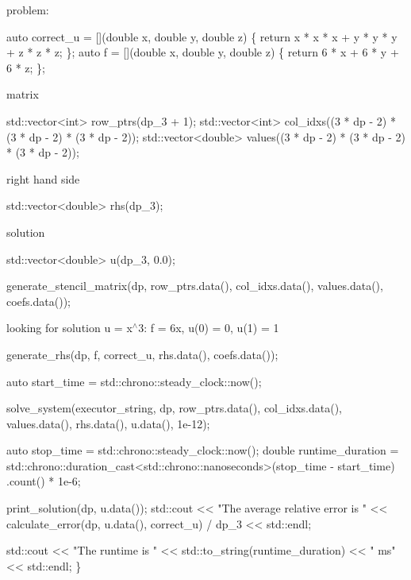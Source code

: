 problem\+:


\begin{DoxyCode}
\textcolor{keyword}{auto} correct\_u = [](\textcolor{keywordtype}{double} x, \textcolor{keywordtype}{double} y, \textcolor{keywordtype}{double} z) \{
    \textcolor{keywordflow}{return} x * x * x + y * y * y + z * z * z;
\};
\textcolor{keyword}{auto} f = [](\textcolor{keywordtype}{double} x, \textcolor{keywordtype}{double} y, \textcolor{keywordtype}{double} z) \{ \textcolor{keywordflow}{return} 6 * x + 6 * y + 6 * z; \};
\end{DoxyCode}


matrix


\begin{DoxyCode}
std::vector<int> row\_ptrs(dp\_3 + 1);
std::vector<int> col\_idxs((3 * dp - 2) * (3 * dp - 2) * (3 * dp - 2));
std::vector<double> values((3 * dp - 2) * (3 * dp - 2) * (3 * dp - 2));
\end{DoxyCode}


right hand side


\begin{DoxyCode}
std::vector<double> rhs(dp\_3);
\end{DoxyCode}


solution


\begin{DoxyCode}
std::vector<double> u(dp\_3, 0.0);

generate\_stencil\_matrix(dp, row\_ptrs.data(), col\_idxs.data(), values.data(),
                        coefs.data());
\end{DoxyCode}


looking for solution u = x$^\wedge$3\+: f = 6x, u(0) = 0, u(1) = 1


\begin{DoxyCode}
    generate\_rhs(dp, f, correct\_u, rhs.data(), coefs.data());

    \textcolor{keyword}{auto} start\_time = std::chrono::steady\_clock::now();

    solve\_system(executor\_string, dp, row\_ptrs.data(), col\_idxs.data(),
                 values.data(), rhs.data(), u.data(), 1e-12);

    \textcolor{keyword}{auto} stop\_time = std::chrono::steady\_clock::now();
    \textcolor{keywordtype}{double} runtime\_duration =
        std::chrono::duration\_cast<std::chrono::nanoseconds>(stop\_time -
                                                             start\_time)
            .count() *
        1e-6;

    print\_solution(dp, u.data());
    std::cout << \textcolor{stringliteral}{"The average relative error is "}
              << calculate\_error(dp, u.data(), correct\_u) / dp\_3 << std::endl;

    std::cout << \textcolor{stringliteral}{"The runtime is "} << std::to\_string(runtime\_duration) << \textcolor{stringliteral}{" ms"}
              << std::endl;
\}
\end{DoxyCode}
 \label{_Results}%
